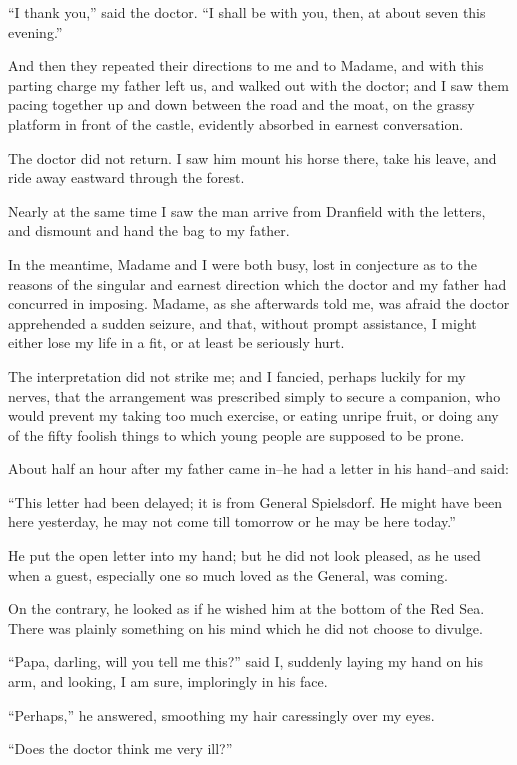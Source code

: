 \documentclass[11pt,twoside,makeidx,hidelinks,]{memoir}
\begin{document}
``I thank you,'' said the doctor. ``I shall be with you, then, at about
seven this evening.''

And then they repeated their directions to me and to Madame, and with
this parting charge my father left us, and walked out with the doctor;
and I saw them pacing together up and down between the road and the
moat, on the grassy platform in front of the castle, evidently absorbed
in earnest conversation.

The doctor did not return. I saw him mount his horse there, take his
leave, and ride away eastward through the forest.

Nearly at the same time I saw the man arrive from Dranfield with the
letters, and dismount and hand the bag to my father.

In the meantime, Madame and I were both busy, lost in conjecture as to
the reasons of the singular and earnest direction which the doctor and
my father had concurred in imposing. Madame, as she afterwards told me,
was afraid the doctor apprehended a sudden seizure, and that, without
prompt assistance, I might either lose my life in a fit, or at least be
seriously hurt.

The interpretation did not strike me; and I fancied, perhaps luckily for
my nerves, that the arrangement was prescribed simply to secure a
companion, who would prevent my taking too much exercise, or eating
unripe fruit, or doing any of the fifty foolish things to which young
people are supposed to be prone.

About half an hour after my father came in--he had a letter in his
hand--and said:

``This letter had been delayed; it is from General Spielsdorf. He might
have been here yesterday, he may not come till tomorrow or he may be
here today.''

He put the open letter into my hand; but he did not look pleased, as he
used when a guest, especially one so much loved as the General,
was coming.

On the contrary, he looked as if he wished him at the bottom of the Red
Sea. There was plainly something on his mind which he did not choose
to divulge.

``Papa, darling, will you tell me this?'' said I, suddenly laying my hand
on his arm, and looking, I am sure, imploringly in his face.

``Perhaps,'' he answered, smoothing my hair caressingly over my eyes.

``Does the doctor think me very ill?''
\end{document}
